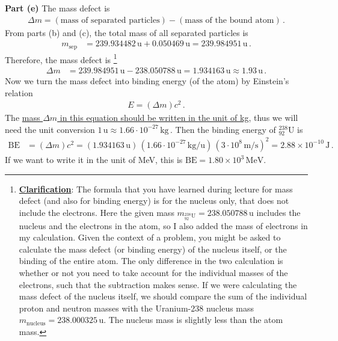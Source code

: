 \documentclass[11pt]{article}
\begin{document}
\noindent\textbf{Part (e)} The mass defect is
\begin{align*}
\Delta m = (\text{mass of separated particles}) - (\text{mass of the bound atom})\,.
\end{align*}
From parts (b) and (c), the total mass of all separated particles is
\begin{align*}
m_{\text{sep}} &= 239.934482\,\text{u} + 0.050469\,\text{u}= 239.984951\,\text{u}\,.
\end{align*}
Therefore, the mass defect is \footnote{\underline{\textbf{Clarification}}: The formula that you have learned during lecture for mass defect (and also for binding energy) is for the nucleus only, that does not include the electrons. Here the given mass $m_{{}^{238}_{92}\text{U}} = 238.050788\,\text{u}$ includes the nucleus and the electrons in the atom, so I also added the mass of electrons in my calculation. Given the context of a problem, you might be asked to calculate the mass defect (or binding energy) of the nucleus itself, or the binding of the entire atom. The only difference in the two calculation is whether or not you need to take account for the individual masses of the electrons, such that the subtraction makes sense. If we were calculating the mass defect of the nucleus itself, we should compare the sum of the individual proton and neutron  masses with the Uranium-238 nucleus mass $m_{\text{nucleus}} = 238.000325$\,u. The nucleus mass is slightly less than the atom mass.}
\begin{align*}
\Delta m &= 239.984951\,\text{u} - 238.050788\,\text{u}= 1.934163\,\text{u}\approx 1.93\,\text{u}\,.
\end{align*}
Now we turn the mass defect into binding energy (of the atom) by Einstein's relation
\begin{align*}
E = (\Delta m)c^2\,.
\end{align*}
The \underline{mass $\Delta m$ in this equation should be written in the unit of kg}, thus we will need the unit conversion $
1\,\text{u} \approx 1.66\cdot 10^{-27}\,\text{kg}\,.$ Then the binding energy of $^{238}_{92}\text{U}$ is
\begin{align*}
\text{BE} &= (\Delta m) c^2 = (1.934163\,\text{u})\,(1.66\cdot 10^{-27}\,\text{kg}/\text{u})\,(3\cdot 10^8\,\text{m/s})^2=  2.88\times 10^{-10}\,\text{J}\,.
\end{align*}
If we want to write it in the unit of MeV, this is $\text{BE}=1.80\times 10^3\,\text{MeV}$.\\
\end{document}
